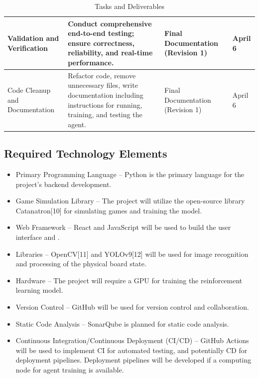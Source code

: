 \documentclass{article}
\begin{document}
\begin{table}[htbp]
\begin{tabular}{|p{3cm}|p{5cm}|p{3cm}|p{2cm}|}
Validation and Verification & Conduct comprehensive end-to-end testing; ensure correctness, reliability, and real-time performance. & Final Documentation (Revision 1) & April 6 \\ \hline

Code Cleanup and Documentation & Refactor code, remove unnecessary files, write documentation including instructions for running, training, and testing the agent. & Final Documentation (Revision 1) & April 6 \\ \hline

\end{tabular}
\caption{Tasks and Deliverables}
\label{tab:tasks-deliverables}
\end{table}

\FloatBarrier


\subsection{Required Technology Elements}\label{subsec:requiredtech}
\begin{itemize}
    \item {Primary Programming Language} – Python is the primary language for the project's backend development.
    \item {Game Simulation Library} – The project will utilize the open-source library Catanatron[10] for simulating \emph{\Catan{}} games and training the \AI{} model.
    \item {Web Framework} – React and JavaScript will be used to build the user interface and \DigitalTwin{}.
    \item {\CV{} Libraries} – OpenCV[11] and YOLOv9[12] will be used for image recognition and processing of the physical board state.
    \item {Hardware} – The project will require a GPU for training the reinforcement learning model.
    \item {Version Control} – GitHub will be used for version control and collaboration.
    \item {Static Code Analysis} – SonarQube is planned for static code analysis.
    \item {Continuous Integration/Continuous Deployment (CI/CD)} – GitHub Actions will be used to implement CI for automated testing, and potentially CD for deployment pipelines. Deployment pipelines will be developed if a computing node for \RL{} agent training is available.
\end{itemize}
\end{document}
